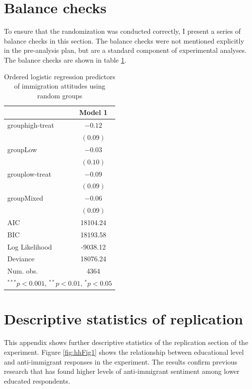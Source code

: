 \documentclass{article}\usepackage[]{graphicx}\usepackage[]{color}
\begin{document}
\begin{appendix}
\newpage

\section{Balance checks} \label{app:balance_checks}

To ensure that the randomization was conducted correctly, I present a series of balance checks in this section. The balance checks were not mentioned explicitly in the pre-analysis plan, but are a standard component of experimental analyses. The balance checks are shown in table \ref{table:balanceCheckImmig}.


\begin{table}
\begin{center}
\begin{tabular}{l c }
\hline
 & Model 1 \\
\hline
grouphigh-treat & $-0.12$  \\
                & $(0.09)$ \\
groupLow        & $-0.03$  \\
                & $(0.10)$ \\
grouplow-treat  & $-0.09$  \\
                & $(0.09)$ \\
groupMixed      & $-0.06$  \\
                & $(0.09)$ \\
\hline
AIC             & 18104.24 \\
BIC             & 18193.58 \\
Log Likelihood  & -9038.12 \\
Deviance        & 18076.24 \\
Num. obs.       & 4364     \\
\hline
\multicolumn{2}{l}{\scriptsize{$^{***}p<0.001$, $^{**}p<0.01$, $^*p<0.05$}}
\end{tabular}
\caption{Ordered logistic regression predictors of immigration attitudes using random groups}
\label{table:balanceCheckImmig}
\end{center}
\end{table}


\newpage

\section{Descriptive statistics of replication} \label{appendix:descriptives}

This appendix shows further descriptive statistics of the replication section of the experiment. Figure \ref{fig:hhFig1} shows the relationship between educational level and anti-immigrant responses in the experiment. The results confirm previous research that has found higher levels of anti-immigrant sentiment among lower educated respondents.



\end{appendix}
\end{document}
